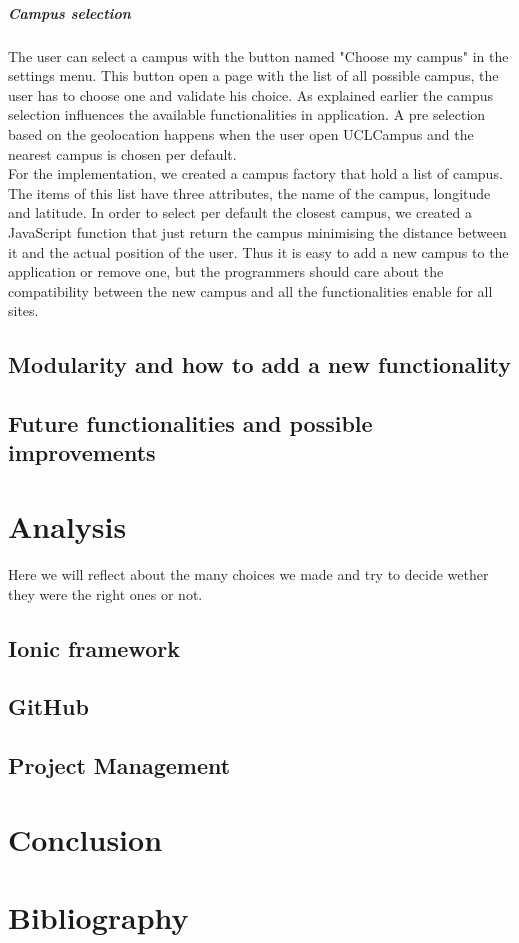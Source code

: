 \documentclass[11pt, a4paper]{report}
\begin{document}
\paragraph{Campus selection} The user can select a campus with the button named "Choose my campus" in the settings menu. This button open a page with the list of all possible campus, the user has to choose one and validate his choice. As explained earlier the campus selection influences the available functionalities in application. A pre selection based on the geolocation happens when the user open UCLCampus and the nearest campus is chosen per default.\\
For the implementation, we created a campus factory that hold a list of campus. The items of this list have three attributes, the name of the campus, longitude and latitude. In order to select per default the closest campus, we created a JavaScript function that just return the campus minimising the distance between it and the actual position of the user. Thus it is easy to add a new campus to the application or remove one, but the programmers should care about the compatibility between the new campus and all the functionalities enable for all sites. 


\section{Modularity and how to add a new functionality}


\section{Future functionalities and possible improvements}

\chapter{Analysis}

Here we will reflect about the many choices we made and try to decide wether they were the right ones or not.

\section{Ionic framework}

\section{GitHub}

\section{Project Management}


\chapter{Conclusion} 

\chapter{Bibliography}
\end{document}
